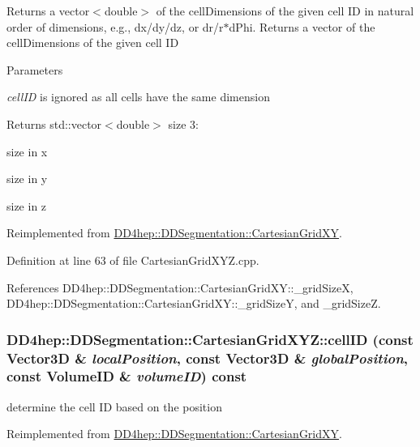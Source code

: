 Returns a vector$<$double$>$ of the cellDimensions of the given cell ID in natural order of dimensions, e.g., dx/dy/dz, or dr/r$\ast$dPhi. Returns a vector of the cellDimensions of the given cell ID 
\begin{DoxyParams}{Parameters}
\item[{\em cellID}]is ignored as all cells have the same dimension \end{DoxyParams}
\begin{DoxyReturn}{Returns}
std::vector$<$double$>$ size 3:
\begin{DoxyEnumerate}
\item size in x
\item size in y
\item size in z 
\end{DoxyEnumerate}
\end{DoxyReturn}


Reimplemented from \hyperlink{class_d_d4hep_1_1_d_d_segmentation_1_1_cartesian_grid_x_y_a34189fa472ffda38fc7d865df8412ba0}{DD4hep::DDSegmentation::CartesianGridXY}.

Definition at line 63 of file CartesianGridXYZ.cpp.

References DD4hep::DDSegmentation::CartesianGridXY::\_\-gridSizeX, DD4hep::DDSegmentation::CartesianGridXY::\_\-gridSizeY, and \_\-gridSizeZ.\hypertarget{class_d_d4hep_1_1_d_d_segmentation_1_1_cartesian_grid_x_y_z_a50e24896d0efee32af5349b3c69d4866}{
\subsubsection[{cellID}]{ DD4hep::DDSegmentation::CartesianGridXYZ::cellID (const {\bf Vector3D} \& {\em localPosition}, \/  const {\bf Vector3D} \& {\em globalPosition}, \/  const {\bf VolumeID} \& {\em volumeID}) const}}
\label{class_d_d4hep_1_1_d_d_segmentation_1_1_cartesian_grid_x_y_z_a50e24896d0efee32af5349b3c69d4866}


determine the cell ID based on the position 

Reimplemented from \hyperlink{class_d_d4hep_1_1_d_d_segmentation_1_1_cartesian_grid_x_y_ac7de84f02aa18034f60f6319982ac4e3}{DD4hep::DDSegmentation::CartesianGridXY}.

